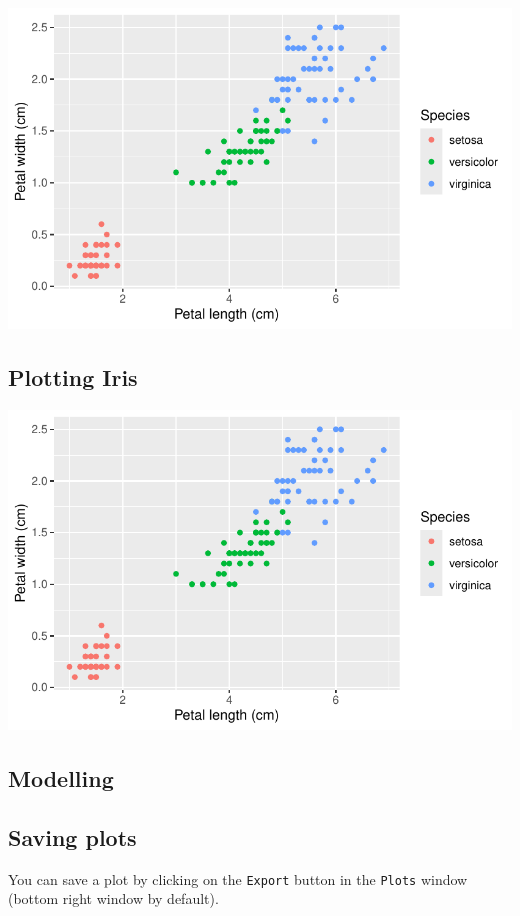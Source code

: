 \documentclass[
  letterpaper,
  DIV=11,
  numbers=noendperiod,
  oneside]{scrartcl}
\begin{document}
\includegraphics{Intro_R_files/figure-pdf/unnamed-chunk-22-1.pdf}

\subsection{Plotting Iris}\label{plotting-iris-1}

\includegraphics{Intro_R_files/figure-pdf/unnamed-chunk-23-1.pdf}

\subsection{Modelling}\label{modelling}

\subsection{Saving plots}\label{saving-plots}

You can save a plot by clicking on the \texttt{Export} button in the
\texttt{Plots} window (bottom right window by default).
\end{document}
